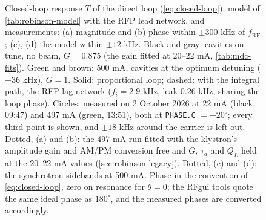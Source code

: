 \begin{figure}[tbp]
\centering
\begin{fitpicture}\end{fitpicture}
\caption[Closed-loop response of the direct loop]{Closed-loop response \(T\) of the direct loop (\cref{eq:closed-loop}), model of \cref{tab:robinson-model} with the RFP lead network, and measurements: (a) magnitude and (b) phase within \(\pm 300\) kHz of \(f_\text{RF}\); (c), (d) the model within \(\pm 12\) kHz. Black and gray: cavities on tune, no beam, \(G = 0.875\) (the gain fitted at 20--22 mA, \cref{tab:mdc-fits}). Green and brown: 500 mA, cavities at the optimum detuning (\(-36\) kHz), \(G = 1\). Solid: proportional loop; dashed: with the integral path, the RFP lag network (\(f_i = 2.9\) kHz, leak 0.26 kHz, sharing the loop phase). Circles: measured on 2 October 2026  at 22 mA (black, 09:47) and 497 mA (green, 13:51), both at \texttt{PHASE.C} \(= -20^\circ\); every third point is shown, and \(\pm 18\) kHz around the carrier is left out. Dotted, (a) and (b): the 497 mA run fitted with the klystron's amplitude gain and AM/PM conversion free and \(G\), \(\tau_d\) and \(Q_L\) held at the 20--22 mA values (\cref{sec:robinson-legacy}). Dotted, (c) and (d): the synchrotron sidebands at 500 mA. Phase in the convention of \cref{eq:closed-loop}, zero on resonance for \(\theta = 0\); the RFgui tools quote the same ideal phase as \(180^\circ\), and the measured phases are converted accordingly.}\label{fig:closed-loop-tf}
\end{figure}

